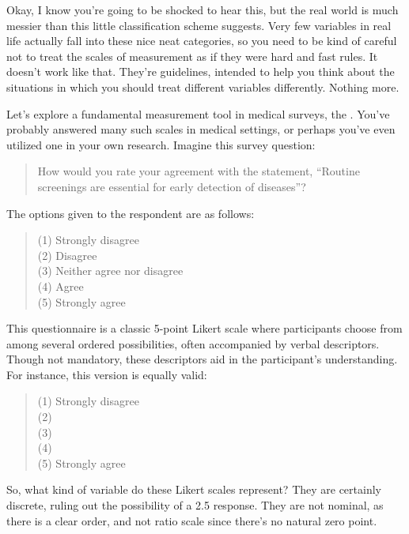 
Okay, I know you're going to be shocked to hear this, but the real world is much messier than this little classification scheme suggests. Very few variables in real life actually fall into these nice neat categories, so you need to be kind of careful not to treat the scales of measurement as if they were hard and fast rules. It doesn't work like that. They're guidelines, intended to help you think about the situations in which you should treat different variables differently. Nothing more. 

Let's explore a fundamental measurement tool in medical surveys, the . You've probably answered many such scales in medical settings, or perhaps you've even utilized one in your own research. Imagine this survey question:

\begin{quote}
How would you rate your agreement with the statement, ``Routine screenings are essential for early detection of diseases''?
\end{quote}

The options given to the respondent are as follows:

\begin{quote}
(1) Strongly disagree\\
(2) Disagree\\
(3) Neither agree nor disagree\\
(4) Agree\\
(5) Strongly agree
\end{quote}

This questionnaire is a classic 5-point Likert scale where participants choose from among several ordered possibilities, often accompanied by verbal descriptors. Though not mandatory, these descriptors aid in the participant's understanding. For instance, this version is equally valid:

\begin{quote}
(1) Strongly disagree\\
(2) \\ (3) \\ (4) \\
(5) Strongly agree
\end{quote}

So, what kind of variable do these Likert scales represent? They are certainly discrete, ruling out the possibility of a 2.5 response. They are not nominal, as there is a clear order, and not ratio scale since there's no natural zero point.

